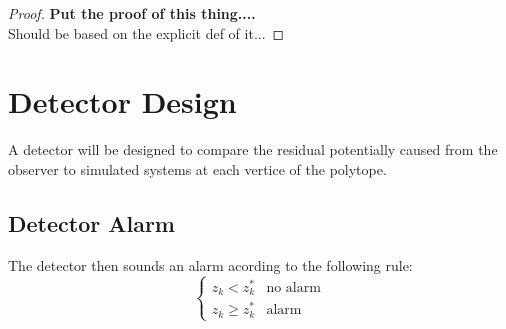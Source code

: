 \documentclass[]{article}
\begin{document}
\begin{proof}
    \textbf{Put the proof of this thing....}\\
    Should be based on the explicit def of it...
\end{proof}

\section{Detector Design}
A detector will be designed to compare the residual potentially caused from the observer 
to simulated systems at each vertice of the polytope.

\subsection{Detector Alarm}
The detector then sounds an alarm acording to the following rule:
\begin{equation}\label{eq:detector_alarm_rule}
    \begin{cases}
        z_k < z_k^*     &\text{no alarm}\\
        z_k \geq z_k^*  &\text{alarm}
    \end{cases}
\end{equation}



%

%




\end{document}
